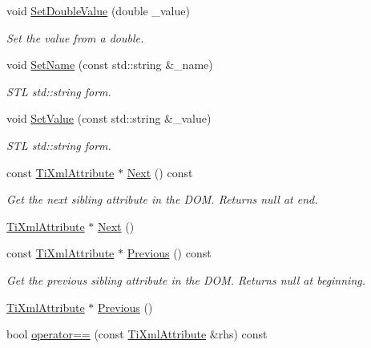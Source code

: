\begin{DoxyCompactItemize}
void \hyperlink{class_ti_xml_attribute_a0316da31373496c4368ad549bf711394}{Set\-Double\-Value} (double \-\_\-value)
\begin{DoxyCompactList}\small\item\em Set the value from a double. \end{DoxyCompactList}\item 
void \hyperlink{class_ti_xml_attribute_ab296ff0c9a8c701055cd257a8a976e57}{Set\-Name} (const std\-::string \&\-\_\-name)
\begin{DoxyCompactList}\small\item\em S\-T\-L std\-::string form. \end{DoxyCompactList}\item 
void \hyperlink{class_ti_xml_attribute_ab43f67a0cc3ec1d80e62606500f0925f}{Set\-Value} (const std\-::string \&\-\_\-value)
\begin{DoxyCompactList}\small\item\em S\-T\-L std\-::string form. \end{DoxyCompactList}\item 
const \hyperlink{class_ti_xml_attribute}{Ti\-Xml\-Attribute} $\ast$ \hyperlink{class_ti_xml_attribute_a776478980776a024f7c2846eec640f65}{Next} () const 
\begin{DoxyCompactList}\small\item\em Get the next sibling attribute in the D\-O\-M. Returns null at end. \end{DoxyCompactList}\item 
\hyperlink{class_ti_xml_attribute}{Ti\-Xml\-Attribute} $\ast$ \hyperlink{class_ti_xml_attribute_a138320aa7793b148ba7e5bd0a0ea4db6}{Next} ()
\item 
const \hyperlink{class_ti_xml_attribute}{Ti\-Xml\-Attribute} $\ast$ \hyperlink{class_ti_xml_attribute_a54a5f8730c7b02b9a41b74e12e27fe86}{Previous} () const 
\begin{DoxyCompactList}\small\item\em Get the previous sibling attribute in the D\-O\-M. Returns null at beginning. \end{DoxyCompactList}\item 
\hyperlink{class_ti_xml_attribute}{Ti\-Xml\-Attribute} $\ast$ \hyperlink{class_ti_xml_attribute_ae4dabc932cba945ed1e92fec5f121193}{Previous} ()
\item 
bool \hyperlink{class_ti_xml_attribute_ae48c2a65b520d453914ce4e845d607cf}{operator==} (const \hyperlink{class_ti_xml_attribute}{Ti\-Xml\-Attribute} \&rhs) const 
\item 

\end{DoxyCompactItemize}
